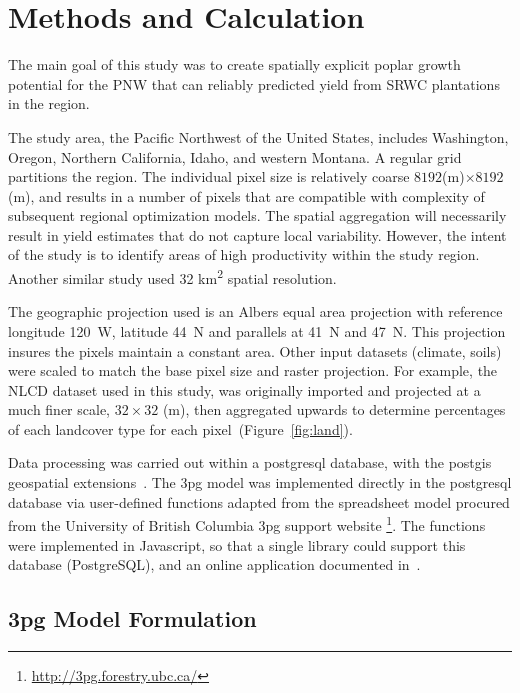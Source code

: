 \documentclass[preprint,12pt]{elsarticle}
\begin{document}
\section{Methods and Calculation}

The main goal of this study was to create spatially explicit poplar
growth potential for the \ac{PNW} that can reliably predicted yield
from \ac{SRWC} plantations in the region.

The study area, the Pacific Northwest of the United States, includes
Washington, Oregon, Northern California, Idaho, and western Montana.
A regular grid partitions the region.  The individual pixel size is
relatively coarse $8192$(m)$ \times 8192$(m), and results in a number
of pixels that are compatible with complexity of subsequent regional
optimization models. The spatial aggregation will necessarily result
in yield estimates that do not capture local variability. However, the
intent of the study is to identify areas of high productivity within
the study region. Another similar study \cite{Headlee2012} used 32
km\textsuperscript{2} spatial resolution.

The geographic projection used is an Albers equal area projection with
reference longitude 120\degree~W, latitude 44\degree~N and parallels
at 41\degree~N and 47\degree~N.
This projection insures the pixels maintain a constant area. Other input
datasets (climate, soils) were scaled to match the base pixel size and
raster projection. For example, the \ac{NLCD} dataset used in this
study, was originally imported and projected at a much finer scale,
$32 \times 32$ (m), then aggregated upwards to determine percentages of
each landcover type for each pixel~(Figure~\ref{fig:land}).

Data processing was carried out within a postgresql database, with the
postgis geospatial extensions~\cite{pgsql,Holl2009,postgis}.  The
\ac{3pg} model was implemented directly in the postgresql database via
user-defined functions adapted from the spreadsheet model procured
from the University of British Columbia \ac{3pg} support website
\footnote{\href{http://3pg.forestry.ubc.ca/}{http://3pg.forestry.ubc.ca/}}.
The functions were implemented in Javascript, so that a single library
could support this database (PostgreSQL), and an online application
documented in~\cite{Prilepova2014}.

\subsection{\acs{3pg} Model Formulation}
\label{sec:3pg}
\end{document}
